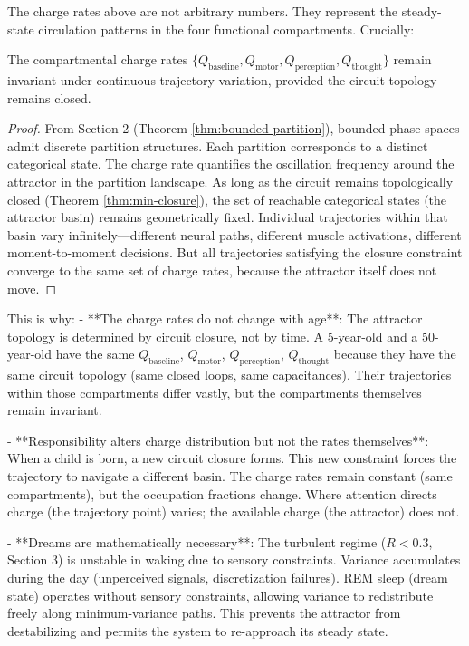The charge rates above are not arbitrary numbers. They represent the steady-state circulation patterns in the four functional compartments. Crucially:

\begin{theorem}
\label{thm:attractor-invariance}
The compartmental charge rates $\{Q_{\text{baseline}}, Q_{\text{motor}}, Q_{\text{perception}}, Q_{\text{thought}}\}$ remain invariant under continuous trajectory variation, provided the circuit topology remains closed.
\end{theorem}

\begin{proof}
From Section 2 (Theorem \ref{thm:bounded-partition}), bounded phase spaces admit discrete partition structures. Each partition corresponds to a distinct categorical state. The charge rate quantifies the oscillation frequency around the attractor in the partition landscape. As long as the circuit remains topologically closed (Theorem \ref{thm:min-closure}), the set of reachable categorical states (the attractor basin) remains geometrically fixed. Individual trajectories within that basin vary infinitely—different neural paths, different muscle activations, different moment-to-moment decisions. But all trajectories satisfying the closure constraint converge to the same set of charge rates, because the attractor itself does not move.
\end{proof}

This is why:
- **The charge rates do not change with age**: The attractor topology is determined by circuit closure, not by time. A 5-year-old and a 50-year-old have the same $Q_{\text{baseline}}$, $Q_{\text{motor}}$, $Q_{\text{perception}}$, $Q_{\text{thought}}$ because they have the same circuit topology (same closed loops, same capacitances). Their trajectories within those compartments differ vastly, but the compartments themselves remain invariant.

- **Responsibility alters charge distribution but not the rates themselves**: When a child is born, a new circuit closure forms. This new constraint forces the trajectory to navigate a different basin. The charge rates remain constant (same compartments), but the occupation fractions change. Where attention directs charge (the trajectory point) varies; the available charge (the attractor) does not.

- **Dreams are mathematically necessary**: The turbulent regime ($R < 0.3$, Section 3) is unstable in waking due to sensory constraints. Variance accumulates during the day (unperceived signals, discretization failures). REM sleep (dream state) operates without sensory constraints, allowing variance to redistribute freely along minimum-variance paths. This prevents the attractor from destabilizing and permits the system to re-approach its steady state.

